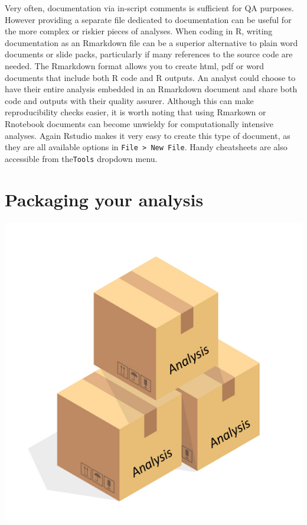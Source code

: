 \documentclass[
]{book}
\begin{document}
Very often, documentation via in-script comments is sufficient for QA purposes. However providing a separate file dedicated to documentation can be useful for the more complex or riskier pieces of analyses. When coding in R, writing documentation as an Rmarkdown file can be a superior alternative to plain word documents or slide packs, particularly if many references to the source code are needed. The Rmarkdown format allows you to create html, pdf or word documents that include both R code and R outputs. An analyst could choose to have their entire analysis embedded in an Rmarkdown document and share both code and outputs with their quality assurer. Although this can make reproducibility checks easier, it is worth noting that using Rmarkown or Rnotebook documents can become unwieldy for computationally intensive analyses. Again Rstudio makes it very easy to create this type of document, as they are all available options in \texttt{File\ \textgreater{}\ New\ File}. Handy cheatsheets are also accessible from the\texttt{Tools} dropdown menu.

\hypertarget{packaging-your-analysis}{%
\section{Packaging your analysis}\label{packaging-your-analysis}}

\includegraphics{pictures/package.png}
\end{document}
